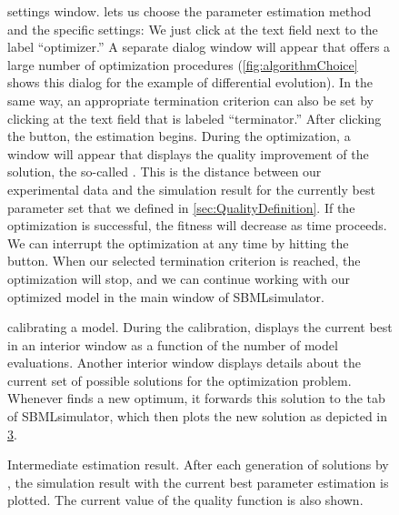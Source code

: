 \begin{figure}[htbp]
\centering
{}
\caption[\EvA settings window]{\EvA settings window.
\EvA lets us choose the parameter estimation method and the specific settings:
We just click at the text field next to the label ``optimizer.''
A separate dialog window will appear that offers a large number of optimization procedures (\cref{fig:algorithmChoice} shows this dialog for the example of differential evolution).
In the same way, an appropriate termination criterion can also be set by clicking at the text field that is labeled ``terminator.''
After clicking the  button, the estimation begins.
During the optimization, a window will appear that displays the quality improvement of the solution, the so-called \emph{\fitness}.
This is the distance between our experimental data and the simulation result for the currently best parameter set that we defined in \cref{sec:QualityDefinition}.
If the optimization is successful, the fitness will decrease as time proceeds.
We can interrupt the optimization at any time by hitting the  button.
When our selected termination criterion is reached, the optimization will stop, and we can continue working with our optimized model in the main window of SBMLsimulator.}
\label{fig:eva2}
\end{figure}
\begin{figure}[htbp]
\centering
{}
\caption[\EvA calibrating a model]{\EvA calibrating a model.
During the calibration, \EvA displays the current best \fitness in an interior window as a function of the number of model evaluations.
Another interior window displays details about the current set of possible solutions for the optimization problem.
Whenever \EvA finds a new optimum, it forwards this solution to the  tab of SBMLsimulator, which then plots the new solution as depicted in \cref{fig:estimationResult}.}
\label{fig:evaOptimizing}
\end{figure}
\begin{SCfigure}
{}
\caption[Configuring the optimization procedure]{Configuring the optimization procedure.
We can select an optimization procedure and define its specific settings in this window. 
Apart from \DE \citep{Storn96Usage}, \EvA provides many other nature-inspired heuristic optimization routines, such as \PSO \citep{ClercKennedy02, Clerc2005}.
The settings of the chosen method can be changed by clicking in the text field right of it and typing the new value or by clicking in the checkbox, respectively.}
\label{fig:algorithmChoice}
\end{SCfigure}
\begin{figure}[h]
\centering
{}
\caption[Intermediate estimation result]{Intermediate estimation result.
After each generation of solutions by \EvA, the simulation result with the current best parameter estimation is plotted.
The current value of the quality function is also shown.}
\label{fig:estimationResult}
\end{figure}


